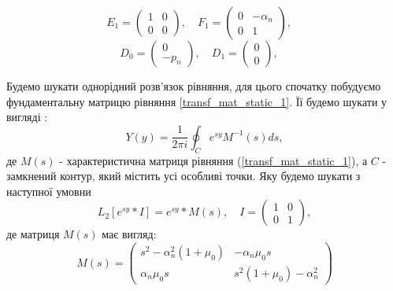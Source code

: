 \begin{equation*}
    E_1 = \begin{pmatrix}
        1 & 0 \\
        0 & 0
    \end{pmatrix}, \quad
    F_1 = \begin{pmatrix}
        0 & -\alpha_n \\
        0 & 1
    \end{pmatrix}, \quad
\end{equation*}
\begin{equation*}
    D_0 = \begin{pmatrix}
        0 \\
        -p_n
    \end{pmatrix}, \quad
    D_1 = \begin{pmatrix}
        0 \\
        0
    \end{pmatrix}, \quad
\end{equation*}

Будемо шукати однорідний розв'язок рівняння,
для цього спочатку побудуємо фундаментальну матрицю рівняння \eqref{transf_mat_static_1}.
Її будемо шукати у вигляді \cite{gantmaher}:
\begin{equation}
    Y(y) = \frac{1}{2\pi i} \oint_C e^{sy} M^{-1}(s)ds,
\end{equation}
де $M(s)$ - характеристична матриця рівняння (\ref{transf_mat_static_1}), а $C$ - замкнений контур, який містить усі особливі точки. Яку будемо шукати з наступної умовни
\begin{equation}
    L_2\left[ e^{sy}*I \right] = e^{sy} * M(s), \quad I = \begin{pmatrix} 1 & 0 \\ 0 & 1 \end{pmatrix},
\end{equation}
де матриця $M(s)$ має вигляд:
\begin{equation}
    M(s) = \begin{pmatrix}
        s^2 -\alpha_n^2(1 + \mu_0) & -\alpha_n \mu_0 s \\
        \alpha_n \mu_0 s & s^2 (1 + \mu_0) -\alpha_n^2
     \end{pmatrix}
\end{equation}

